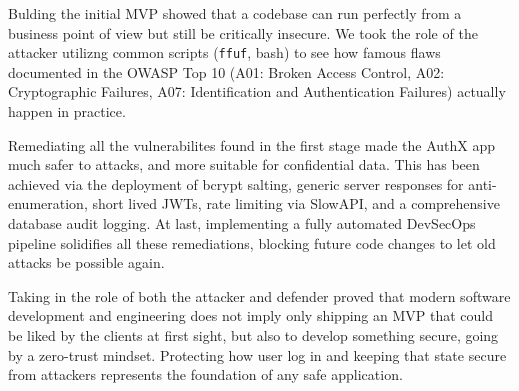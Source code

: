 \documentclass[11pt]{article}
\begin{document}
Bulding the initial MVP showed that a codebase can run perfectly from a business point of view but still be critically insecure. We took the role of the attacker utilizng common scripts (\texttt{ffuf}, bash) to see how famous flaws documented in the OWASP Top 10 (A01: Broken Access Control, A02: Cryptographic Failures, A07: Identification and Authentication Failures) actually happen in practice.

Remediating all the vulnerabilites found in the first stage made the AuthX app much safer to attacks, and more suitable for confidential data. This has been achieved via the deployment of bcrypt salting, generic server responses for anti-enumeration, short lived JWTs, rate limiting via SlowAPI, and a comprehensive database audit logging. At last, implementing a fully automated DevSecOps pipeline solidifies all these remediations, blocking future code changes to let old attacks be possible again.

Taking in the role of both the attacker and defender proved that modern software development and engineering does not imply only shipping an MVP that could be liked by the clients at first sight, but also to develop something secure, going by a zero-trust mindset. Protecting how user log in and keeping that state secure from attackers represents the foundation of any safe application.
\end{document}
